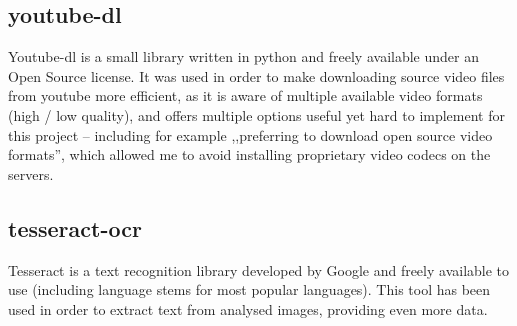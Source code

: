 \subsection{youtube-dl}
Youtube-dl is a small library written in python and freely available under an Open Source license. 
It was used in order to make downloading source video files from youtube more efficient, as it is aware of multiple available video formats (high / low quality), and offers multiple options useful yet hard to implement for this project -- including for example ,,preferring to download open source video formats'', which allowed me to avoid installing proprietary video codecs on the servers.

\subsection{tesseract-ocr}

Tesseract \cite{tesseract} is a text recognition library developed by Google and freely available to use (including language stems for most popular languages).
This tool has been used in order to extract text from analysed images, providing even more data.

